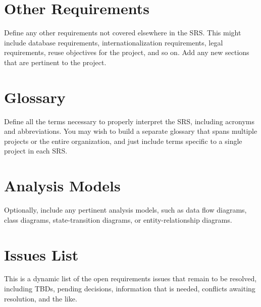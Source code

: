 \documentclass[12pt,oneside,letterpaper]{article}
\begin{document}
\section{Other Requirements}
Define any other requirements not covered elsewhere in the SRS. This might include database requirements, internationalization requirements, legal requirements, reuse objectives for the project, and so on. Add any new sections that are pertinent to the project.

\appendix
\section{Glossary}
Define all the terms necessary to properly interpret the SRS, including acronyms and abbreviations. You may wish to build a separate glossary that spans multiple projects or the entire organization, and just include terms specific to a single project in each SRS.

\section{Analysis Models}
Optionally, include any pertinent analysis models, such as data flow diagrams, class diagrams, state-transition diagrams, or entity-relationship diagrams.

\section{Issues List}
This is a dynamic list of the open requirements issues that remain to be resolved, including TBDs, pending decisions, information that is needed, conflicts awaiting resolution, and the like.
\end{document}
